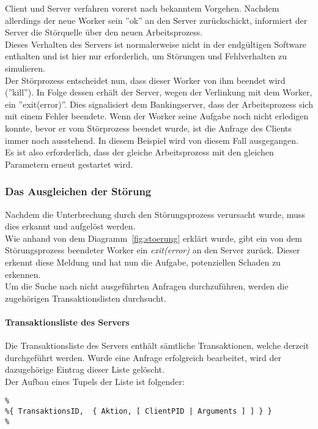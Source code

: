 Client und Server verfahren vorerst nach bekanntem Vorgehen. Nachdem allerdings der neue Worker sein ''ok'' an den Server zurückschickt, informiert der Server die Störquelle über den neuen Arbeitsprozess. \\
Dieses Verhalten des Servers ist normalerweise nicht in der endgültigen Software enthalten und ist hier nur erforderlich, um Störungen und Fehlverhalten zu simulieren.\\
Der Störprozess entscheidet nun, dass dieser Worker von ihm beendet wird (''kill''). In Folge dessen erhält der Server, wegen der Verlinkung mit dem Worker, ein ''exit(error)''. Dies signalisiert dem Bankingserver, dass der Arbeitsprozess sich mit einem Fehler beendete. Wenn der Worker seine Aufgabe noch nicht erledigen konnte, bevor er vom Störprozess beendet wurde, ist die Anfrage des Clients immer noch ausstehend. In diesem Beispiel wird von diesem Fall ausgegangen.\\
Es ist also erforderlich, dass der gleiche Arbeitsprozess mit den gleichen Parametern erneut gestartet wird.

\subsubsection{Das Ausgleichen der Störung}

Nachdem die Unterbrechung durch den Störungsprozess verursacht wurde, muss dies erkannt und aufgelöst werden.\\
Wie anhand von dem Diagramm~\ref{fig:stoerung} erklärt wurde, gibt ein von dem Störungsprozess beendeter Worker ein \textit{exit(error)} an den Server zurück. Dieser erkennt diese Meldung und hat nun die Aufgabe, potenziellen Schaden zu erkennen.\\
Um die Suche nach nicht ausgeführten Anfragen durchzuführen, werden die zugehörigen Transaktionslisten durchsucht.

\paragraph{Transaktionsliste des Servers}

Die Transaktionsliste des Servers enthält sämtliche Transaktionen, welche derzeit durchgeführt werden. Wurde eine Anfrage erfolgreich bearbeitet, wird der dazugehörige Eintrag dieser Liste gelöscht.\\
Der Aufbau eines Tupels der Liste ist folgender:

\begin{lstlisting}
%
%{ TransaktionsID,  { Aktion, [ ClientPID | Arguments ] ] } }
%
\end{lstlisting}

